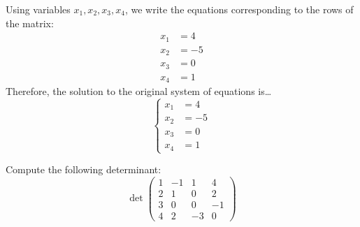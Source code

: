 \documentclass[11pt,letterpaper]{article}
\begin{document}
\sol Using variables $x_1, x_2, x_3, x_4$, we write the equations corresponding to the rows of the matrix: 
	\[
	\begin{aligned}
	x_1&= 4 \\
	x_2&= -5 \\
	x_3&= 0 \\
	x_4&= 1
	\end{aligned}
	\]
Therefore, the solution to the original system of equations is\dots
	\[
	\left\{
	\begin{aligned}
	x_1&= 4 \\
	x_2&= -5 \\
	x_3&= 0 \\
	x_4&= 1
	\end{aligned} \right.
	\]



\newpage



 Compute the following determinant:
	\[
	\det \begin{pmatrix}
	1 & -1 & 1 & 4 \\
	2 & 1 & 0 & 2 \\
	3 & 0 & 0 & -1 \\
	4 & 2 & -3 & 0 
	\end{pmatrix}
	\] \pspace
\end{document}
